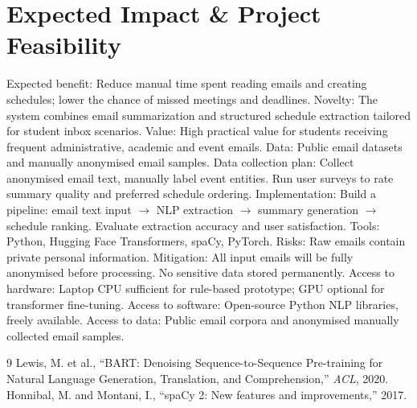 \documentclass{article}
\begin{document}
\section{Expected Impact \& Project Feasibility}
Expected benefit: Reduce manual time spent reading emails and creating schedules; lower the chance of missed meetings and deadlines.
Novelty: The system combines email summarization and structured schedule extraction tailored for student inbox scenarios.
Value: High practical value for students receiving frequent administrative, academic and event emails.
Data: Public email datasets and manually anonymised email samples.
Data collection plan: Collect anonymised email text, manually label event entities. Run user surveys to rate summary quality and preferred schedule ordering.
Implementation: Build a pipeline: email text input $\rightarrow$ NLP extraction $\rightarrow$ summary generation $\rightarrow$ schedule ranking. Evaluate extraction accuracy and user satisfaction.
Tools: Python, Hugging Face Transformers, spaCy, PyTorch.
Risks: Raw emails contain private personal information.
Mitigation: All input emails will be fully anonymised before processing. No sensitive data stored permanently.
Access to hardware: Laptop CPU sufficient for rule-based prototype; GPU optional for transformer fine-tuning.
Access to software: Open-source Python NLP libraries, freely available.
Access to data: Public email corpora and anonymised manually collected email samples.

\begin{thebibliography}{9}
\small
{}
Lewis, M. et al., ``BART: Denoising Sequence-to-Sequence Pre-training for Natural Language Generation, Translation, and Comprehension,'' \emph{ACL}, 2020.
Honnibal, M. and Montani, I., ``spaCy 2: New features and improvements,'' 2017.
\end{thebibliography}
\end{document}
